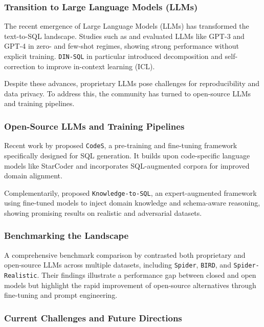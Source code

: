\subsubsection{Transition to Large Language Models (LLMs)}

The recent emergence of Large Language Models (LLMs) has transformed the text-to-SQL landscape. Studies such as \citet{rajkumar2022evaluating} and \citet{pourreza2023dinsql} evaluated LLMs like GPT-3 and GPT-4 in zero- and few-shot regimes, showing strong performance without explicit training. \texttt{DIN-SQL} in particular introduced decomposition and self-correction to improve in-context learning (ICL).

Despite these advances, proprietary LLMs pose challenges for reproducibility and data privacy. To address this, the community has turned to open-source LLMs and training pipelines.

\subsubsection{Open-Source LLMs and Training Pipelines}

Recent work by \citet{li2024codes} proposed \texttt{CodeS}, a pre-training and fine-tuning framework specifically designed for SQL generation. It builds upon code-specific language models like StarCoder and incorporates SQL-augmented corpora for improved domain alignment.

Complementarily, \citet{hong2024knowledge} proposed \texttt{Knowledge-to-SQL}, an expert-augmented framework using fine-tuned models to inject domain knowledge and schema-aware reasoning, showing promising results on realistic and adversarial datasets.

\subsubsection{Benchmarking the Landscape}

A comprehensive benchmark comparison by \citet{gao2024benchmark} contrasted both proprietary and open-source LLMs across multiple datasets, including \texttt{Spider}, \texttt{BIRD}, and \texttt{Spider-Realistic}. Their findings illustrate a performance gap between closed and open models but highlight the rapid improvement of open-source alternatives through fine-tuning and prompt engineering.

\subsubsection{Current Challenges and Future Directions}

